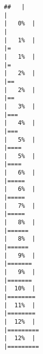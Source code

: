 \documentclass[
]{book}
\begin{document}
\begin{verbatim}
##   |                                                                              |                                                                      |   0%  |                                                                              |                                                                      |   1%  |                                                                              |=                                                                     |   1%  |                                                                              |=                                                                     |   2%  |                                                                              |==                                                                    |   2%  |                                                                              |==                                                                    |   3%  |                                                                              |===                                                                   |   4%  |                                                                              |===                                                                   |   5%  |                                                                              |====                                                                  |   5%  |                                                                              |====                                                                  |   6%  |                                                                              |=====                                                                 |   6%  |                                                                              |=====                                                                 |   7%  |                                                                              |=====                                                                 |   8%  |                                                                              |======                                                                |   8%  |                                                                              |======                                                                |   9%  |                                                                              |=======                                                               |   9%  |                                                                              |=======                                                               |  10%  |                                                                              |========                                                              |  11%  |                                                                              |========                                                              |  12%  |                                                                              |=========                                                             |  12%  |                                                                              |========= 
\end{verbatim}
\end{document}
